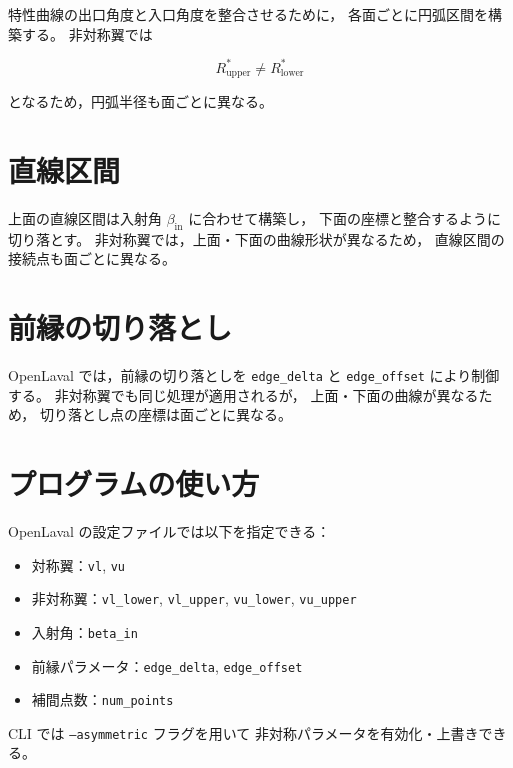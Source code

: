 特性曲線の出口角度と入口角度を整合させるために，
各面ごとに円弧区間を構築する。
非対称翼では


\[
R^\ast_{\mathrm{upper}} \ne R^\ast_{\mathrm{lower}}
\]


となるため，円弧半径も面ごとに異なる。

\section{直線区間}

上面の直線区間は入射角 $\beta_{\mathrm{in}}$ に合わせて構築し，
下面の座標と整合するように切り落とす。
非対称翼では，上面・下面の曲線形状が異なるため，
直線区間の接続点も面ごとに異なる。

\section{前縁の切り落とし}

OpenLaval では，前縁の切り落としを
\texttt{edge\_delta} と \texttt{edge\_offset} により制御する。
非対称翼でも同じ処理が適用されるが，
上面・下面の曲線が異なるため，
切り落とし点の座標は面ごとに異なる。

\section{プログラムの使い方}

OpenLaval の設定ファイルでは以下を指定できる：

\begin{itemize}
  \item 対称翼：\texttt{vl}, \texttt{vu}
  \item 非対称翼：\texttt{vl\_lower}, \texttt{vl\_upper}, \texttt{vu\_lower}, \texttt{vu\_upper}
  \item 入射角：\texttt{beta\_in}
  \item 前縁パラメータ：\texttt{edge\_delta}, \texttt{edge\_offset}
  \item 補間点数：\texttt{num\_points}
\end{itemize}

CLI では \texttt{--asymmetric} フラグを用いて
非対称パラメータを有効化・上書きできる。

